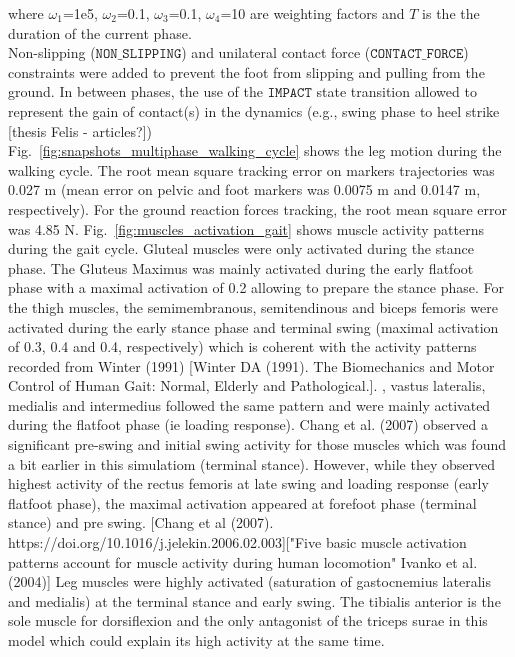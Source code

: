 \noindent where $\omega_1$=1e5, $\omega_2$=0.1, $\omega_3$=0.1, $\omega_4$=10 are  weighting factors and $T$ is the the duration of the current phase.\\

Non-slipping ($\mathtt{NON\_SLIPPING}$) and unilateral contact force ($\mathtt{CONTACT\_FORCE}$) constraints were added to prevent the foot from slipping and pulling from the ground. 
In between phases, the use of the $\mathtt{IMPACT}$ state transition allowed to represent the gain of contact(s) in the dynamics (e.g., swing phase to heel strike [thesis Felis - articles?]) \\

Fig.~\ref{fig:snapshots_multiphase_walking_cycle} shows the leg motion during the walking cycle. 
The root mean square tracking error on markers trajectories was 0.027 m (mean error on pelvic and foot markers was 0.0075 m and 0.0147 m, respectively). 
For the ground reaction forces tracking, the root mean square error was 4.85 N.
Fig.~\ref{fig:muscles_activation_gait} shows muscle activity patterns during the gait cycle.
Gluteal muscles were only activated during the stance phase. The Gluteus Maximus was mainly activated during the early flatfoot phase with a maximal activation of 0.2 allowing to prepare the stance phase. 
For the thigh muscles, the semimembranous, semitendinous and biceps femoris were activated during the early stance phase and terminal swing (maximal activation of 0.3, 0.4 and 0.4, respectively) which is coherent with the activity patterns recorded from Winter (1991) [Winter DA (1991). The Biomechanics and Motor Control of Human Gait: Normal, Elderly and Pathological.].  
, vastus lateralis, medialis and intermedius followed the same pattern and were mainly activated during the flatfoot phase (ie loading response). Chang et al. (2007) observed a significant pre-swing and initial swing activity for those muscles which was found a bit earlier in this simulatiom (terminal stance).
However, while they observed highest activity of the rectus femoris at late swing and loading response (early flatfoot phase), the maximal activation appeared at  forefoot phase (terminal stance) and pre swing. [Chang et al (2007). https://doi.org/10.1016/j.jelekin.2006.02.003]["Five basic muscle activation patterns account for muscle activity during human locomotion" Ivanko et al. (2004)] 
Leg muscles were highly activated (saturation of gastocnemius lateralis and medialis) at the terminal stance and early swing. The tibialis anterior is the sole muscle for dorsiflexion and the only antagonist of the triceps surae in this model which could explain its high activity at the same time. 

